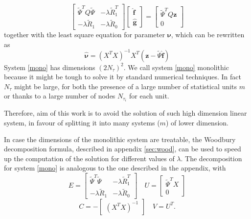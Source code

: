 \begin{equation}
	\label{mono}
	\begin{bmatrix}
		\tilde{\Psi}^TQ\tilde{\Psi} & -\lambda \tilde{R}_1^T \\
		-\lambda \tilde{R}_1        & -\lambda \tilde{R}_0
	\end{bmatrix}
	\begin{bmatrix}
		\hat{\bm{f}} \\
		\hat{\bm{g}}
	\end{bmatrix}
	=
	\begin{bmatrix}
		\tilde{\Psi}^T Q\bm{z} \\
		0
	\end{bmatrix}
\end{equation}
together with the least square equation for parameter $\bm{\nu}$,
which can be rewritten as
\begin{equation}
	\label{nu}
	\hat{\bm{\nu}}=\left(X^TX\right)^{-1}X^T(\bm{z}-\tilde{\Psi}\hat{\bm{f}})
\end{equation}
System \ref{mono} has dimensions $\left(2 N_{\tau}\right)^2$. We call
system \ref{mono} monolithic because it might be tough to solve it by standard
numerical techniques. In fact $N_{\tau}$ might be large, for both the presence
of a large number of statistical units $m$ or thanks to a large number of nodes
$N_{\tau_i}$ for each unit.

Therefore, aim of this work is to avoid the solution of such high dimension
linear system, in favour of splitting it into many systems ($m$) of lower
dimension.

In case the dimensions of the monolithic system are treatable, the Woodbury
decomposition formula, described in appendix \ref{sec:wood}, can be used to
speed up the computation of the solution for different values of $\lambda$. The
decomposition for system \ref{mono} is analogous to the one described in the
appendix, with
\begin{equation}
	\label{eq:wootilde}
	E =
	\begin{bmatrix}
		\tilde{\Psi}^T\tilde{\Psi} & -\lambda \tilde{R}_1^T \\
		-\lambda \tilde{R}_1       & -\lambda \tilde{R}_0
	\end{bmatrix}
	\quad U =
	\begin{bmatrix}
		\tilde{\Psi}^TX \\
		0
	\end{bmatrix}
\end{equation}
\begin{equation*}
	C = -
	\begin{bmatrix}
		\left(X^TX\right)^{-1}
	\end{bmatrix}
	\quad V = U^T.
\end{equation*}

